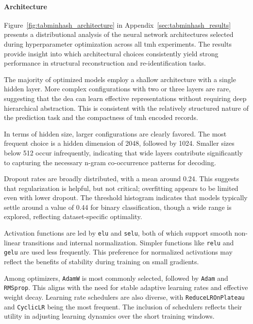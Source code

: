 \paragraph{Architecture}

Figure~\ref{fig:tabminhash_architecture} in Appendix~\ref{sec:tabminhash_results} presents a distributional analysis of the neural network architectures selected during hyperparameter optimization across all \ac{tmh} experiments.
The results provide insight into which architectural choices consistently yield strong performance in structural reconstruction and re-identification tasks.

The majority of optimized models employ a shallow architecture with a single hidden layer.
More complex configurations with two or three layers are rare, suggesting that the \ac{dea} can learn effective representations without requiring deep hierarchical abstraction.
This is consistent with the relatively structured nature of the prediction task and the compactness of \ac{tmh} encoded records.

In terms of hidden size, larger configurations are clearly favored.
The most frequent choice is a hidden dimension of 2048, followed by 1024.
Smaller sizes below 512 occur infrequently, indicating that wide layers contribute significantly to capturing the necessary n-gram co-occurrence patterns for decoding.

Dropout rates are broadly distributed, with a mean around 0.24.
This suggests that regularization is helpful, but not critical; overfitting appears to be limited even with lower dropout.
The threshold histogram indicates that models typically settle around a value of 0.44 for binary classification, though a wide range is explored, reflecting dataset-specific optimality.

Activation functions are led by \texttt{elu} and \texttt{selu}, both of which support smooth non-linear transitions and internal normalization.
Simpler functions like \texttt{relu} and \texttt{gelu} are used less frequently.
This preference for normalized activations may reflect the benefits of stability during training on small gradients.

Among optimizers, \texttt{AdamW} is most commonly selected, followed by \texttt{Adam} and \texttt{\texttt{RMSprop}}.
This aligns with the need for stable adaptive learning rates and effective weight decay.
Learning rate schedulers are also diverse, with \texttt{ReduceLROnPlateau} and \texttt{CyclicLR} being the most frequent.
The inclusion of schedulers reflects their utility in adjusting learning dynamics over the short training windows.

